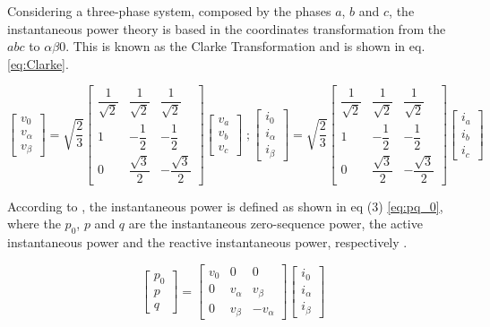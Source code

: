 Considering a three-phase system, composed by the phases $a$, $b$ and $c$, the instantaneous power theory is based in the coordinates transformation from the $abc$ to $\alpha \beta 0 $. This is known as the Clarke Transformation and is shown in eq. \ref{eq:Clarke}.


\begin{equation}
\begin{bmatrix}
v_0\\
v_\alpha\\
v_\beta
\end{bmatrix}
= \sqrt{\dfrac{2}{3}}
\begin{bmatrix}
\dfrac{1}{\sqrt{2}}	& \dfrac{1}{\sqrt{2}}	& \dfrac{1}{\sqrt{2}}		\\[2ex]
1					& -\dfrac{1}{2}			& -\dfrac{1}{2}				\\[2ex]
0					& \dfrac{\sqrt{3}}{2}	& -\dfrac{\sqrt{3}}{2}
\end{bmatrix}
\begin{bmatrix}
v_a\\
v_b\\
v_c
\end{bmatrix}
\; ;
\begin{bmatrix}
i_0\\
i_\alpha\\
i_\beta
\end{bmatrix}
= \sqrt{\dfrac{2}{3}}
\begin{bmatrix}
\dfrac{1}{\sqrt{2}}	& \dfrac{1}{\sqrt{2}}	& \dfrac{1}{\sqrt{2}}		\\[2ex]
1					& -\dfrac{1}{2}			& -\dfrac{1}{2}				\\[2ex]
0					& \dfrac{\sqrt{3}}{2}	& -\dfrac{\sqrt{3}}{2}
\end{bmatrix}
\begin{bmatrix}
i_a\\
i_b\\
i_c
\end{bmatrix}
\label{eq:Clarke}
\end{equation} 

According to \citep{Akagi2007}, the instantaneous power is defined as shown in eq (3) \ref{eq:pq_0}, where the $p_0$, $p$ and $q$ are the instantaneous zero-sequence power, the active instantaneous power and the reactive instantaneous power, respectively \citep{Akagi2007,Peng1996}.

\begin{equation}
\begin{bmatrix}
p_0\\
p\\
q
\end{bmatrix}=
\begin{bmatrix}
v_0		&	0			&	0\\
0		&	v_{\alpha}	&	v_{\beta}\\
0		&	v_{\beta}	&	-v_{\alpha}
\end{bmatrix}
\begin{bmatrix}
i_{0}\\
i_{\alpha}\\
i_{\beta}
\end{bmatrix}
\label{eq:pq_0}
\end{equation} 

